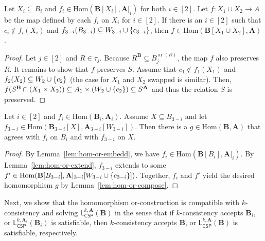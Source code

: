 \documentclass[a4paper,english, thm-restate]{lipics-v2021}
\DeclarePairedDelimiter\set{\lbrace}{\rbrace}
\newcommand{\sig}{\tau}
\newcommand{\arity}[1]{\operatorname*{ar}(#1)}
\newcommand{\StructA}{\mathbf{A}}
\newcommand{\StructB}{\mathbf{B}}
\newcommand{\restrict}[2]{#1|_{#2}}
\newcommand{\Hom}[2]{\mathrm{Hom}(#1,#2)}
\newcommand{\leqs}{\mathsf{L}}
\newcommand{\cspiso}[3]{\leqs^{#1,#2}_{\mathsf{CSP}}(#3)}
\begin{document}
	\begin{lemma}
		\label{lem:hom-or-compose}
		Let $X_i \subseteq B_i$ and $f_i \in \Hom{\StructB[X_i]}{\restrict{\StructA}{i}}$ for both $i\in[2]$.
		Let $f\colon X_1\cup X_2 \to A$ be the map defined by each $f_i$ on $X_i$ for $i \in[2]$.
		If there is an $i\in[2]$ such that $c_i \notin f_i(X_i)$
		and $f_{3-i}(B_{3-i}) \subseteq W_{3-i} \cup \set{c_{3-i}}$,
		then $f \in \Hom{\StructB[X_1\cup X_2]}{\StructA}$.
	\end{lemma}
	\begin{proof}
		Let $j\in[2]$ and $R \in \sig_j$.
		Because $R^\StructB \subseteq B_j^{\arity{R}}$,
		the map $f$ also preserves $R$.
		It remains to show that $f$ preserves $S$.
		Assume that $c_1 \notin f_1(X_1)$
		and $f_{2}(X_{2}) \subseteq W_{2} \cup \set{c_{2}}$ (the case for $X_1$ and $X_2$ swapped is similar).
		Then, $f(S^\StructB \cap(X_1 \times X_2)) \subseteq A_1 \times (W_{2} \cup \set{c_2}) \subseteq S^{\StructA}$
		and thus the relation $S$ is preserved.
	\end{proof}
	
	\begin{corollary}
		\label{cor:hom-or-compose-simple}
		Let $i \in [2]$ and $f_i \in \Hom{\StructB_i}{\StructA_i}$.
		Assume $X \subseteq B_{3-i}$ and let 
		$f_{3-i} \in \Hom{\StructB_{3-i}[X]}{\StructA_{3-i}[W_{3-i}]}$.
		Then there is a $g \in \Hom{\StructB}{\StructA}$
		that agrees with $f_i$ on $B_i$ and with $f_{3-i}$ on $X$.
	\end{corollary}
	\begin{proof}
		By Lemma~\ref{lem:hom-or-embedd}, we have $f_i \in \Hom{\StructB[B_i]}{\restrict{\StructA}{i}}$.
		By Lemma~\ref{lem:hom-or-extend},
		$f_{3-i}$ extends to some $f' \in \Hom{\StructB[B_{3-i}]}{\restrict{\StructA}{3-i}[W_{3-i} \cup \set{c_{3-i}}]}$.
		Together, $f_i$ and $f'$ yield the desired homomorphism $g$ by Lemma~\ref{lem:hom-or-compose}.
	\end{proof}
	
	\noindent Next, we show that the homomorphism or-construction is compatible
	with $k$-consistency and solving $\cspiso{k}{\StructA}{\StructB}$
	in the sense that if $k$-consistency
	accepts $\StructB_i$, or $\cspiso{k}{\StructA_i}{\StructB_i}$
	is satisfiable,
	then $k$-consistency accepts $\StructB$, or $\cspiso{k}{\StructA}{\StructB}$
	is satisfiable, respectively.
	
\end{document}
